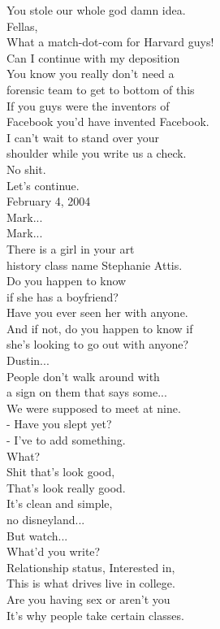 \documentclass{article}
\begin{document}
\begin{multicols}{3}
You stole our whole god damn idea.\\
Fellas,\\
What a match-dot-com for Harvard guys!\\
Can I continue with my deposition\\
You know you really don't need a\\
forensic team to get to bottom of this\\
If you guys were the inventors of\\
Facebook you'd have invented Facebook.\\
I can't wait to stand over your\\
shoulder while you write us a check.\\
No shit.\\
Let's continue.\\
February 4, 2004\\
Mark...\\
Mark...\\
There is a girl in your art\\
history class name Stephanie Attis.\\
Do you happen to know\\
if she has a boyfriend?\\
Have you ever seen her with anyone.\\
And if not, do you happen to know if\\
she's looking to go out with anyone?\\
Dustin...\\
People don't walk around with\\
a sign on them that says some...\\
We were supposed to meet at nine.\\
- Have you slept yet?\\
- I've to add something.\\
What?\\
Shit that's look good,\\
That's look really good.\\
It's clean and simple,\\
no disneyland...\\
But watch...\\
What'd you write?\\
Relationship status, Interested in,\\
This is what drives live in college.\\
Are you having sex or aren't you\\
It's why people take certain classes.\\

\end{multicols}
\end{document}
